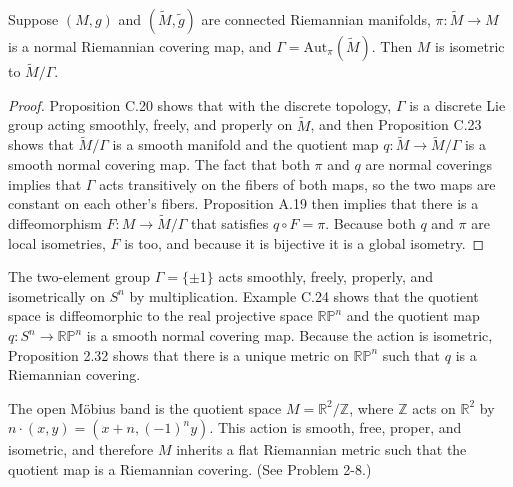 \begin{corollary}
\label{cor:isometric-to-quotient}
Suppose $(M, g)$ and $(\widetilde{M}, \tilde{g})$ are connected Riemannian manifolds, $\pi: \widetilde{M} \to M$ is a normal Riemannian covering map, and $\Gamma = \text{Aut}_\pi(\widetilde{M})$. Then $M$ is isometric to $\widetilde{M}/\Gamma$.
\end{corollary}

\begin{proof}
Proposition C.20 shows that with the discrete topology, $\Gamma$ is a discrete Lie group acting smoothly, freely, and properly on $\widetilde{M}$, and then Proposition C.23 shows that $\widetilde{M}/\Gamma$ is a smooth manifold and the quotient map $q: \widetilde{M} \to \widetilde{M}/\Gamma$ is a smooth normal covering map. The fact that both $\pi$ and $q$ are normal coverings implies that $\Gamma$ acts transitively on the fibers of both maps, so the two maps are constant on each other's fibers. Proposition A.19 then implies that there is a diffeomorphism $F: M \to \widetilde{M}/\Gamma$ that satisfies $q \circ F = \pi$. Because both $q$ and $\pi$ are local isometries, $F$ is too, and because it is bijective it is a global isometry.
\end{proof}

\begin{example}
\label{ex:real-projective-space-metric}
The two-element group $\Gamma = \{\pm1\}$ acts smoothly, freely, properly, and isometrically on $S^n$ by multiplication. Example C.24 shows that the quotient space is diffeomorphic to the real projective space $\mathbb{RP}^n$ and the quotient map $q: S^n \to \mathbb{RP}^n$ is a smooth normal covering map. Because the action is isometric, Proposition 2.32 shows that there is a unique metric on $\mathbb{RP}^n$ such that $q$ is a Riemannian covering.
\end{example}

\begin{example}
\label{ex:open-mobius-band}
The open Möbius band is the quotient space $M = \mathbb{R}^2/\mathbb{Z}$, where $\mathbb{Z}$ acts on $\mathbb{R}^2$ by $n \cdot (x,y) = (x+n, (-1)^n y)$. This action is smooth, free, proper, and isometric, and therefore $M$ inherits a flat Riemannian metric such that the quotient map is a Riemannian covering. (See Problem 2-8.)
\end{example}

